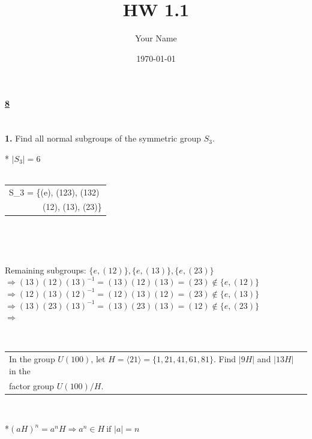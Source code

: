 \documentclass[12pt, letterpaper]{article}
\title{HW 1.1}
\author{Your Name}
\date{\today}
\begin{document}
 
\paragraph{\underline{8} \\ \\}
\textbf{1.}  Find all normal subgroups of the symmetric group $S_3$. 
\begin{center}
    * $|S_3| = 6$ \\
    \Rightarrow \ 
\end{center} 
\begin{center}
    \begin{tabular}[t]{l}
     S_3 = \{(e), (123), (132) \\
     \ \ \ \ \  \ \ \ (12), (13), (23)\}
\end{tabular} \\
\Rightarrow {}
\end{center}
\begin{center}
     \\
\end{center}
\begin{center}
    Remaining subgroups: $\{e, (12)\}, \{e, (13)\}, \{e, (23)\}$ \\
    $\Rightarrow (13)(12)(13)^{-1} = (13)(12)(13) = (23) \notin \{e, (12)\}$ \\
    $\Rightarrow (12)(13)(12)^{-1} = (12)(13)(12) = (23) \notin \{e, (13)\}$ \\
    $\Rightarrow (13)(23)(13)^{-1} = (13)(23)(13) = (12) \notin \{e, (23)\}$ \\
    $\Rightarrow$ 
\end{center}
\quad \quad \ \  \ \begin{tabular}[t]{l}
     In the group $U(100)$, let $H = \langle 21 \rangle = \{1, 21, 41, 61, 81\}$. Find $|9H|$ and $|13H|$ in the \\ factor group $U(100)/H$. 
\end{tabular} \\
\begin{center}
    *$(aH)^n = a^n H \Rightarrow a^n \in H \ \text{if $|a| = n$}$
\end{center} 
\end{document}
